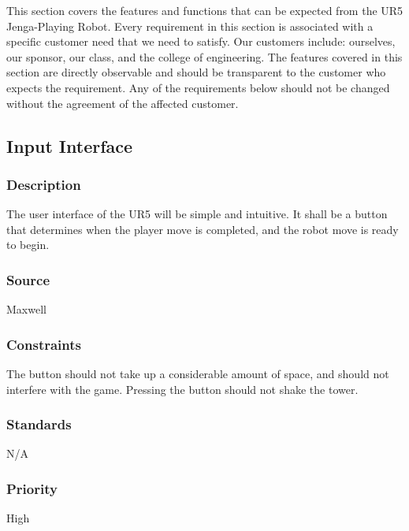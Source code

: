 This section covers the features and functions that can be expected from the UR5 Jenga-Playing Robot. Every requirement in this section is associated with a specific customer need that we need to satisfy. Our customers include: ourselves, our sponsor, our class, and the college of engineering. The features covered in this section are directly observable and should be transparent to the customer who expects the requirement. Any of the requirements below should not be changed without the agreement of the affected customer.

\subsection{Input Interface}
\subsubsection{Description}
The user interface of the UR5 will be simple and intuitive. It shall be a button that determines when the player move is completed, and the robot move is ready to begin. 
\subsubsection{Source}
Maxwell
\subsubsection{Constraints}
The button should not take up a considerable amount of space, and should not interfere with the game. Pressing the button should not shake the tower.
\subsubsection{Standards}
N/A
\subsubsection{Priority}
High

